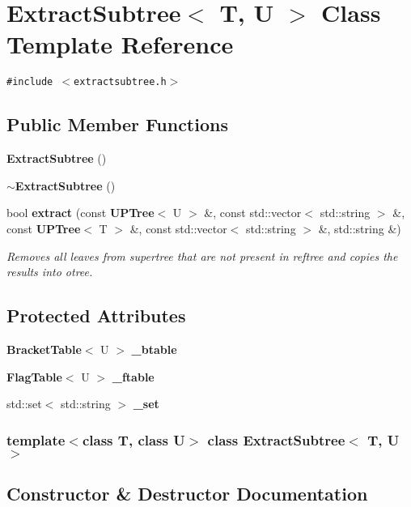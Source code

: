 \section{Extract\-Subtree$<$ T, U $>$ Class Template Reference}
\label{classExtractSubtree}
{\tt \#include $<$extractsubtree.h$>$}

\subsection*{Public Member Functions}
\begin{CompactItemize}
\item 
{\bf Extract\-Subtree} ()
\item 
{\bf $\sim$Extract\-Subtree} ()
\item 
bool {\bf extract} (const {\bf UPTree}$<$ U $>$ \&, const std::vector$<$ std::string $>$ \&, const {\bf UPTree}$<$ T $>$ \&, const std::vector$<$ std::string $>$ \&, std::string \&)
\begin{CompactList}\small\item\em Removes all leaves from supertree that are not present in reftree and copies the results into otree. \item\end{CompactList}\end{CompactItemize}
\subsection*{Protected Attributes}
\begin{CompactItemize}
\item 
{\bf Bracket\-Table}$<$ U $>$ {\bf \_\-btable}
\item 
{\bf Flag\-Table}$<$ U $>$ {\bf \_\-ftable}
\item 
std::set$<$ std::string $>$ {\bf \_\-set}
\end{CompactItemize}
\subsubsection*{template$<$class T, class U$>$ class Extract\-Subtree$<$ T, U $>$}



\subsection{Constructor \& Destructor Documentation}
